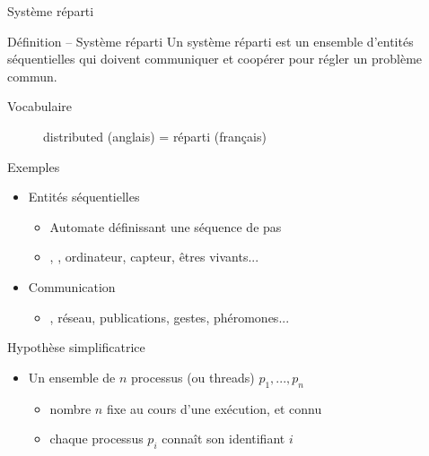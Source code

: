 
\begingroup

\begin{frame}{Système réparti}

  \vfill
  \begin{block}{Définition -- Système réparti}
    Un système réparti est un ensemble d'entités séquentielles
    qui doivent communiquer et coopérer pour régler un
    problème commun.
    \begin{description}
    \item[Vocabulaire] distributed (anglais) = réparti (français)
    \end{description}
  \end{block}

  \vfill
  \begin{exampleblock}{Exemples}
    \begin{itemize}
    \item Entités séquentielles
      \begin{itemize}
      \item Automate définissant une séquence de \alert{pas}
      \item {}, , ordinateur, capteur, êtres vivants...
      \end{itemize}
    \item Communication
      \begin{itemize}
      \item {}, réseau, publications, gestes, phéromones...
      \end{itemize}
    \end{itemize}
  \end{exampleblock}
  \vfill  

  \pause
  \begin{alertblock}{Hypothèse simplificatrice}
    \begin{itemize}
    \item Un ensemble de \alert{$n$ processus} (ou threads) $p_1, ..., p_n$
      \begin{itemize}
      \item nombre $n$ fixe au cours d'une exécution, et connu
      \item chaque processus $p_i$ connaît son identifiant $i$
      \end{itemize}
    \end{itemize}
  \end{alertblock}
  \vfill  
\end{frame}

\endgroup
\endinput
